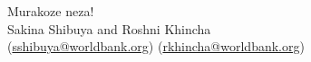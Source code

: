 \documentclass[10pt]{beamer}
\begin{document}
	\begin{frame}
		\begin{center}
			\Large Murakoze neza! \\
			\vspace{10mm}
			\normalsize Sakina Shibuya and Roshni Khincha  \\
			\small (\url{sshibuya@worldbank.org})
			\small (\url{rkhincha@worldbank.org})			
		\end{center}
	\end{frame}	
	
	
\end{document}
